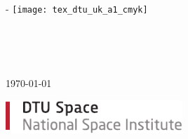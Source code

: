\begin{titlingpage}
	\thispagestyle{empty}
	\enlargethispage{1.3cm}
	\calccentering{\unitlength}
	\begin{adjustwidth}{\unitlength}{-\unitlength}
		\vspace*{-1.9cm}
		\hspace{7cm}
		{\noindent \texttt{[image: tex\_dtu\_uk\_a1\_cmyk]}}
		
		\begin{raggedright}
			{\huge\sffamily\authorname\\[2cm]}
			\begin{Spacing}{1.2}
				{\sffamily\HUGE\textbf{\ttitle}\\ [0.5cm]}
				{\sffamily\huge\textbf{\stitle}\\[1.5cm]}				
				{\sffamily\LARGE{\today}\\[2cm]}
			\end{Spacing}
			\vspace{\stretch{2}}
		\end{raggedright}
		\begin{raggedright}
			\includegraphics[width=0.5\textwidth]{figures/tex_dtu_space_b_uk}%
		\end{raggedright}
	\end{adjustwidth}
%
	\clearpage

	\thispagestyle{empty}
	\enlargethispage{1.3cm}
	\calccentering{\unitlength}
	


\end{titlingpage}
